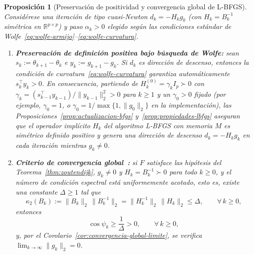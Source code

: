 \documentclass[a4paper,openany,oneside,10pt]{report}
\theoremstyle{pnlTeorema}
\newtheorem{proposicion}{Proposición}[section]
\theoremstyle{pnlDefinicion}
\theoremstyle{pnlObservacion}
\begin{document}
\begin{proposicion}[Preservación de positividad y convergencia global de L-BFGS]
\label{prop:convergencia-lbfgs}
Considérese una iteración de tipo cuasi-Newton $d_k=-H_k g_k$ (con $H_k=B_k^{-1}$
simétrica en $\mathbb{R}^{p\times p}$) y paso $\alpha_k>0$ elegido según las
condiciones estándar de Wolfe~\eqref{eq:wolfe-armijo}--\eqref{eq:wolfe-curvatura}.
\begin{enumerate}
\item \textbf{Preservación de definición positiva bajo búsqueda de Wolfe:} sean
$s_k:=\theta_{k+1}-\theta_k$ e $y_k:=g_{k+1}-g_k$. Si $d_k$ es dirección de descenso,
entonces la condición de curvatura~\eqref{eq:wolfe-curvatura} garantiza
automáticamente $s_k^\top y_k>0$. En consecuencia, partiendo de
$H_k^{(0)}=\gamma_k I_p\succ 0$ con $\gamma_k=(s_{k-1}^\top y_{k-1})/\|y_{k-1}\|_2^2>0$
para $k\ge 1$ y un $\gamma_0>0$ fijado (por ejemplo, $\gamma_0=1$, o $\gamma_0=1/\max\{1,\|g_0\|_2\}$ en la implementación), las Proposiciones~\ref{prop:actualizacion-bfgs}
y~\ref{prop:propiedades-lbfgs} aseguran que el operador implícito $H_k$ del
algoritmo L-BFGS con memoria $M$ es simétrico definido positivo y genera una
dirección de descenso $d_k=-H_k g_k$ en cada iteración mientras $g_k\neq 0$.
\item \textbf{Criterio de convergencia global~\cite[pp.~99--100]{andrei2020}:}
si $F$ satisface las hipótesis del Teorema~\ref{thm:zoutendijk}, $g_k\neq 0$ y
$H_k=B_k^{-1}\succ 0$ para todo $k\ge 0$, y el número de condición espectral está
uniformemente acotado, esto es, existe una constante $\Delta\ge 1$ tal que
\begin{equation}\label{eq:condicion-uniforme-lbfgs}
\kappa_2(B_k) := \|B_k\|_2\,\|B_k^{-1}\|_2 = \|H_k^{-1}\|_2\,\|H_k\|_2 \le \Delta,
\qquad \forall\,k\ge 0,
\end{equation}
entonces
\begin{equation}\label{eq:cota-coseno-cuasinewton}
\cos\psi_k \ge \frac{1}{\Delta} > 0, \qquad \forall\,k\ge 0,
\end{equation}
y, por el Corolario~\ref{cor:convergencia-global-limite}, se verifica
$\lim_{k\to\infty}\|g_k\|_2 = 0$.
\end{enumerate}
\end{proposicion}
\end{document}
